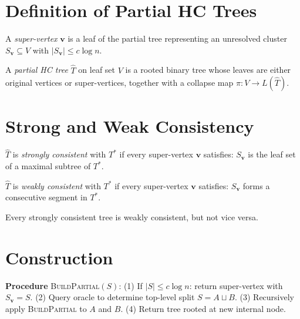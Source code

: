 \section{Definition of Partial HC Trees}

\begin{definition}
A \emph{super-vertex} $\mathbf{v}$ is a leaf of the partial tree representing an unresolved cluster $S_\mathbf{v} \subseteq V$ with $|S_\mathbf{v}| \leq c\log n$.
\end{definition}

\begin{definition}
A \emph{partial HC tree} $\widehat{T}$ on leaf set $V$ is a rooted binary tree whose leaves are either original vertices or super-vertices, together with a collapse map $\pi : V \to L(\widehat{T})$.
\end{definition}

\section{Strong and Weak Consistency}

\begin{definition}
$\widehat{T}$ is \emph{strongly consistent} with $T^*$ if every super-vertex $\mathbf{v}$ satisfies: $S_\mathbf{v}$ is the leaf set of a maximal subtree of $T^*$.
\end{definition}

\begin{definition}
$\widehat{T}$ is \emph{weakly consistent} with $T^*$ if every super-vertex $\mathbf{v}$ satisfies: $S_\mathbf{v}$ forms a consecutive segment in $T^*$.
\end{definition}

Every strongly consistent tree is weakly consistent, but not vice versa.

\section{Construction}

\begin{algorithm}
\textbf{Procedure} \textsc{BuildPartial}$(S)$:
(1) If $|S| \leq c\log n$: return super-vertex with $S_\mathbf{v} = S$.
(2) Query oracle to determine top-level split $S = A \sqcup B$.
(3) Recursively apply \textsc{BuildPartial} to $A$ and $B$.
(4) Return tree rooted at new internal node.
\end{algorithm}

